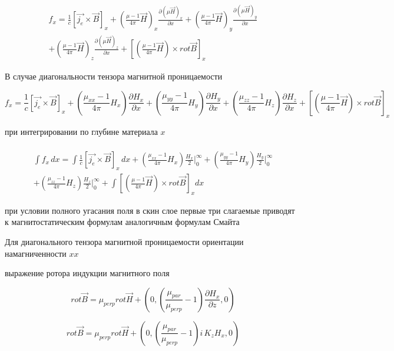 \documentclass[11pt]{article}
\begin{document}
    \[\begin{array}{c} \\
f_x
= \frac{1}{c} \left[\vec {j_e} \times \vec{B} \right]_x
+ \left(\frac{\mu - 1}{4 \pi}\vec{H}\right)_x \frac{\partial \left(\mu \vec{H}\right)_x}{\partial x}
+ \left(\frac{\mu - 1}{4 \pi}\vec{H}\right)_y \frac{\partial \left(\mu \vec{H}\right)_y}{\partial x} \\
+ \left(\frac{\mu - 1}{4 \pi}\vec{H}\right)_z \frac{\partial \left(\mu \vec{H}\right)_z}{\partial x}
+ \left[\left(\frac{\mu - 1}{4 \pi}\vec{H}\right) \times rot \vec{B}\right]_x
\end{array}\]

    В случае диагональности тензора магнитной проницаемости

\[
f_x
= \frac{1}{c} \left[\vec {j_e} \times \vec{B} \right]_x
+ \left(\frac{\mu_{xx} - 1}{4 \pi}H_x\right) \frac{\partial H_x}{\partial x}
+ \left(\frac{\mu_{yy} - 1}{4 \pi}H_y\right) \frac{\partial H_y}{\partial x}
+ \left(\frac{\mu_{zz} - 1}{4 \pi}H_z\right) \frac{\partial H_z}{\partial x}
+ \left[\left(\frac{\mu - 1}{4 \pi}\vec{H}\right) \times rot \vec{B}\right]_x
\]

при интегрировании по глубине материала \(x\)

    \[\begin{array}{c} \\
\int f_x \, dx
= \int \frac{1}{c} \left[\vec {j_e} \times \vec{B} \right]_x \, dx
+ \left(\frac{\mu_{xx} - 1}{4 \pi}H_x\right) \frac{H_x}{2} \Bigg|_{0}^{\infty}
+ \left(\frac{\mu_{yy} - 1}{4 \pi}H_y\right) \frac{H_y}{2} \Bigg|_{0}^{\infty} \\
+ \left(\frac{\mu_{zz} - 1}{4 \pi}H_z\right) \frac{H_z}{2} \Bigg|_{0}^{\infty}
+ \int \left[\left(\frac{\mu - 1}{4 \pi}\vec{H}\right) \times rot \vec{B}\right]_x dx
\end{array}\]

при условии полного угасания поля в скин слое первые три слагаемые
приводят к магнитостатическим формулам аналогичным формулам Смайта

    Для диагонального тензора магнитной проницаемости ориентации
намагниченности \(xx\)

выражение ротора индукции магнитного поля

\[rot \vec B = \mu_{perp} rot \vec H + \left(0,\left(\frac{\mu_{par}}{\mu_{perp}}-1\right)\frac{\partial H_x}{\partial z}, 0\right)\]

\[rot \vec B = \mu_{perp} rot \vec H + \left(0,\left(\frac{\mu_{par}}{\mu_{perp}}-1\right)i\,K_z {H_x}, 0\right)\]
\end{document}
